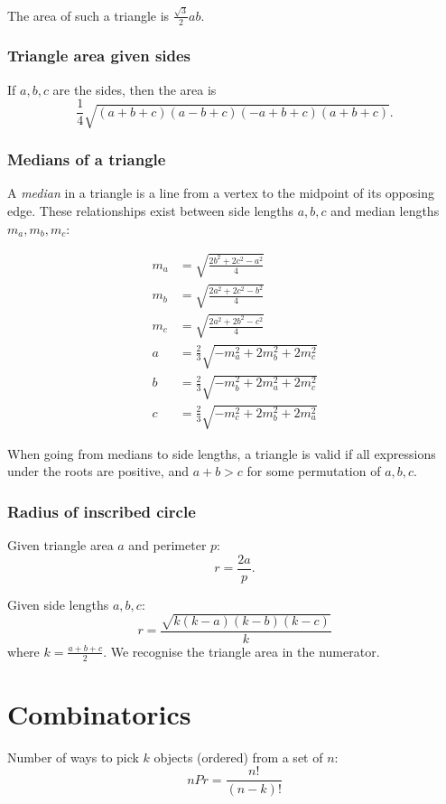 \documentclass[a4paper,11pt]{article}
\begin{document}
The area of such a triangle is $\frac{\sqrt{3}}{2}ab$.

\subsubsection{Triangle area given sides}

If $a,b,c$ are the sides, then the area is $$\frac{1}{4}\sqrt{(a+b+c)(a-b+c)(-a+b+c)(a+b+c)}.$$

\subsubsection{Medians of a triangle}

A \emph{median} in a triangle is a line from a vertex to the midpoint of its opposing edge. These relationships exist between side lengths $a,b,c$ and median lengths $m_a,m_b,m_c$:

\begin{align*}
	m_a &= \sqrt{\frac{2b^2+2c^2-a^2}{4}}\\
	m_b &= \sqrt{\frac{2a^2+2c^2-b^2}{4}}\\
	m_c &= \sqrt{\frac{2a^2+2b^2-c^2}{4}}\\
	a &= \frac{2}{3}\sqrt{-m_a^2 + 2m_b^2 + 2m_c^2} \\
	b &= \frac{2}{3}\sqrt{-m_b^2 + 2m_a^2 + 2m_c^2} \\
	c &= \frac{2}{3}\sqrt{-m_c^2 + 2m_b^2 + 2m_a^2}
\end{align*}

When going from medians to side lengths, a triangle is valid if all expressions under the roots are positive, and $a+b>c$ for some permutation of $a,b,c$.

\subsubsection{Radius of inscribed circle}

Given triangle area $a$ and perimeter $p$: $$r=\frac{2a}{p}.$$

Given side lengths $a,b,c$:
$$r=\frac{\sqrt{k(k-a)(k-b)(k-c)}}{k}$$ where $k=\frac{a+b+c}{2}$. We recognise the triangle area in the numerator.

\section{Combinatorics}

Number of ways to pick $k$ objects (ordered) from a set of $n$: $$n P r = \frac{n!}{(n-k)!}$$
\end{document}
